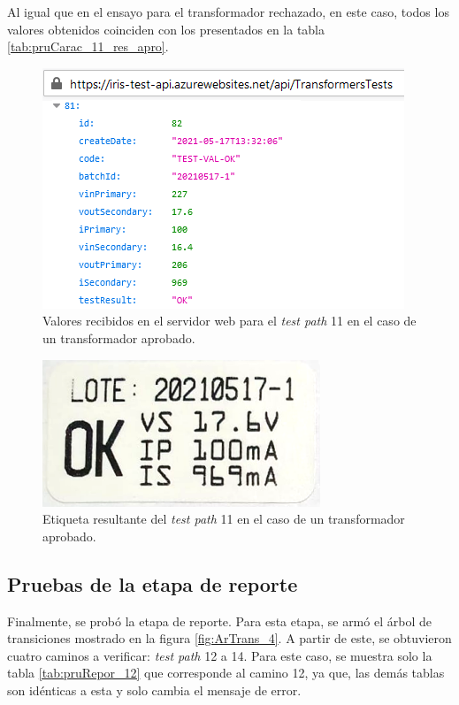 Al igual que en el ensayo para el transformador rechazado, en este caso, todos los valores obtenidos coinciden con los presentados en la tabla \ref{tab:pruCarac_11_res_apro}.

\pagebreak

\begin{figure}[htpb]
	\centering
	\includegraphics[scale=0.9]{./Figures/serv_web_ok_resul.png}
	\caption{Valores recibidos en el servidor web para el \textit{test path} 11 en el caso de un transformador aprobado.}
	\label{fig:serv_web_ok_resul}
\end{figure}

\begin{figure}[htpb]
	\centering
	\includegraphics[scale=0.7]{./Figures/etiqueta_OK.png}
	\caption{Etiqueta resultante del \textit{test path} 11 en el caso de un transformador aprobado.}
	\label{fig:etiqueta_OK}
\end{figure}


\subsection{Pruebas de la etapa de reporte}

Finalmente, se probó la etapa de reporte. Para esta etapa, se armó el árbol de transiciones mostrado en la figura \ref{fig:ArTrans_4}. A partir de este, se obtuvieron cuatro caminos a verificar: \textit{test path} 12 a 14. Para este caso, se muestra solo la tabla \ref{tab:pruRepor_12} que corresponde al camino 12, ya que, las demás tablas son idénticas a esta y solo cambia el mensaje de error.


